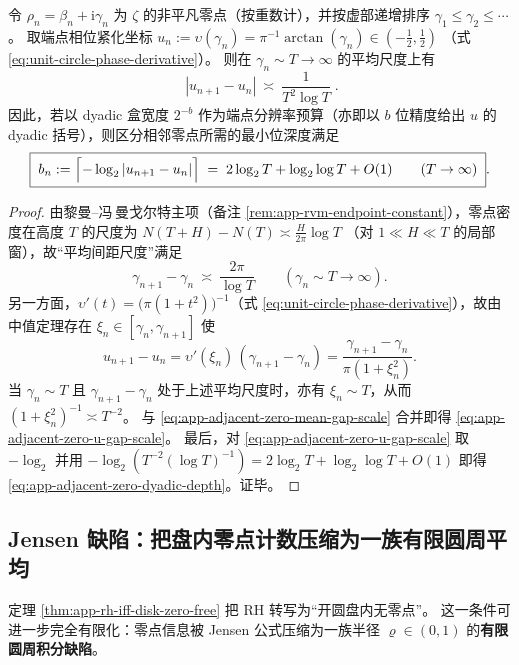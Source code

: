 \begin{proposition}\label{prop:app-adjacent-zero-dyadic-resolution}
令 \(\rho_n=\beta_n+\mathrm{i}\gamma_n\) 为 \(\zeta\) 的非平凡零点（按重数计），并按虚部递增排序 \(\gamma_1\le \gamma_2\le\cdots\)。
取端点相位紧化坐标
\(
u_n:=\upsilon(\gamma_n)=\pi^{-1}\arctan(\gamma_n)\in(-\tfrac12,\tfrac12)
\)
（式 \eqref{eq:unit-circle-phase-derivative}）。
则在 \(\gamma_n\sim T\to\infty\) 的平均尺度上有
\begin{equation}\label{eq:app-adjacent-zero-u-gap-scale}
\boxed{\;
|u_{n+1}-u_n|\ \asymp\ \frac{1}{T^{2}\log T}\; }.
\end{equation}
因此，若以 dyadic 盒宽度 \(2^{-b}\) 作为端点分辨率预算（亦即以 \(b\) 位精度给出 \(u\) 的 dyadic 括号），则区分相邻零点所需的最小位深度满足
\begin{equation}\label{eq:app-adjacent-zero-dyadic-depth}
\boxed{\;
b_{n}:=\Bigl\lceil-\log_{2}|u_{n+1}-u_n|\Bigr\rceil
\;=\;2\log_{2}T+\log_{2}\log T+O(1)\qquad(T\to\infty)\; }.
\end{equation}
\end{proposition}

\begin{proof}
由黎曼--冯\,曼戈尔特主项（备注 \ref{rem:app-rvm-endpoint-constant}），零点密度在高度 \(T\) 的尺度为
\(
N(T+H)-N(T)\asymp \frac{H}{2\pi}\log T
\)
（对 \(1\ll H\ll T\) 的局部窗），故“平均间距尺度”满足
\begin{equation}\label{eq:app-adjacent-zero-mean-gap-scale}
\gamma_{n+1}-\gamma_n\ \asymp\ \frac{2\pi}{\log T}
\qquad(\gamma_n\sim T\to\infty).
\end{equation}
另一方面，\(\upsilon'(t)=\bigl(\pi(1+t^2)\bigr)^{-1}\)（式 \eqref{eq:unit-circle-phase-derivative}），故由中值定理存在 \(\xi_n\in[\gamma_n,\gamma_{n+1}]\) 使
\[
u_{n+1}-u_n=\upsilon'(\xi_n)\,(\gamma_{n+1}-\gamma_n)
=\frac{\gamma_{n+1}-\gamma_n}{\pi(1+\xi_n^{2})}.
\]
当 \(\gamma_n\sim T\) 且 \(\gamma_{n+1}-\gamma_n\) 处于上述平均尺度时，亦有 \(\xi_n\sim T\)，从而 \((1+\xi_n^2)^{-1}\asymp T^{-2}\)。
与 \eqref{eq:app-adjacent-zero-mean-gap-scale} 合并即得 \eqref{eq:app-adjacent-zero-u-gap-scale}。
最后，对 \eqref{eq:app-adjacent-zero-u-gap-scale} 取 \(-\log_2\) 并用 \(-\log_2(T^{-2}(\log T)^{-1})=2\log_2 T+\log_2\log T+O(1)\) 即得 \eqref{eq:app-adjacent-zero-dyadic-depth}。证毕。
\end{proof}

\subsection{Jensen 缺陷：把盘内零点计数压缩为一族有限圆周平均}\label{subsec:unit-disk-jensen-defect}
定理 \ref{thm:app-rh-iff-disk-zero-free} 把 RH 转写为“开圆盘内无零点”。
这一条件可进一步完全有限化：零点信息被 Jensen 公式压缩为一族半径 \(\varrho\in(0,1)\) 的\textbf{有限圆周积分缺陷}。

